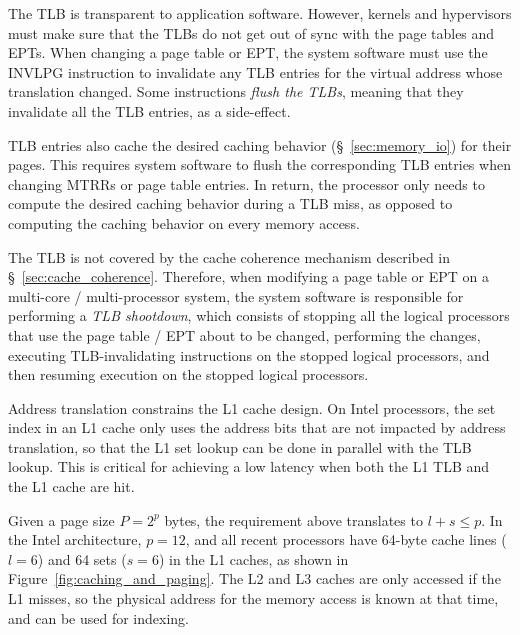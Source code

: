 The TLB is transparent to application software. However, kernels and
hypervisors must make sure that the TLBs do not get out of sync with the page
tables and EPTs. When changing a page table or EPT, the system software must
use the INVLPG instruction to invalidate any TLB entries for the virtual
address whose translation changed. Some instructions \textit{flush the TLBs},
meaning that they invalidate all the TLB entries, as a side-effect.


TLB entries also cache the desired caching behavior (\S~\ref{sec:memory_io})
for their pages. This requires system software to flush the corresponding TLB
entries when changing MTRRs or page table entries. In return, the processor
only needs to compute the desired caching behavior during a TLB miss, as
opposed to computing the caching behavior on every memory access.


The TLB is not covered by the cache coherence mechanism described in
\S~\ref{sec:cache_coherence}. Therefore, when modifying a page table or EPT on
a multi-core / multi-processor system, the system software is responsible for
performing a \textit{TLB shootdown}, which consists of stopping all the logical
processors that use the page table / EPT about to be changed, performing the
changes, executing TLB-invalidating instructions on the stopped logical
processors, and then resuming execution on the stopped logical processors.

Address translation constrains the L1 cache design. On Intel processors, the
set index in an L1 cache only uses the address bits that are not impacted by
address translation, so that the L1 set lookup can be done in parallel with the
TLB lookup. This is critical for achieving a low latency when both the L1 TLB
and the L1 cache are hit.

Given a page size $P = 2^{p}$ bytes, the requirement
above translates to $l + s \le p$. In the Intel architecture, $p = 12$, and all
recent processors have 64-byte cache lines ($l = 6$) and 64 sets ($s = 6$) in
the L1 caches, as shown in Figure~\ref{fig:caching_and_paging}.
The L2 and L3 caches are only accessed if the L1 misses, so the physical
address for the memory access is known at that time, and can be used for
indexing.

